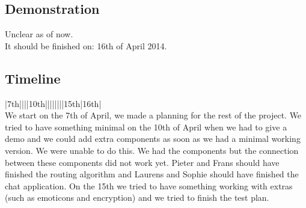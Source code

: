 \documentclass{report}
\begin{document}
    \subsection{Demonstration}
    Unclear as of now. \\
    It should be finished on: 16th of April 2014.

    \subsection{Timeline}

    |7th||||10th||||||||15th|16th| \\
    We start on the 7th of April, we made a planning for the rest of the project. We tried to have something minimal on the 10th of April when we had to give a demo and we could add extra components as soon as we had a minimal working version.
    We were unable to do this. We had the components but the connection between these components did not work yet.
    Pieter and Frans should have finished the routing algorithm and Laurens and Sophie should have finished the chat application.
    On the 15th we tried to have something working with extras (such as emoticons and encryption) and we tried to finish the test plan.
\end{document}

